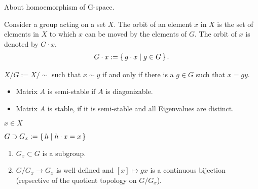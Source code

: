 \begin{rembox}
    \begin{remark}
        About homoemorphism of G-space.
    \end{remark}
\end{rembox}

\begin{defbox}
    \begin{definition}
        Consider a group acting on a set \(X\). The orbit of an element \(x\) in \(X\) is the set of elements in \(X\) to which \(x\) can be moved by the elements of \(G\). The orbit of \(x\) is denoted by \(G \cdot x\).
        \begin{align*}
            G \cdot x := \left\{\, g \cdot x \mid g \in G \,\right\} \text{.}
        \end{align*}
    \end{definition}
\end{defbox}

\begin{defbox}
    \begin{definition}
        \(X / G := X / \sim\) such that \(x \sim y\) if and only if there is a \(g \in G\) such that \(x = gy\).
    \end{definition}
\end{defbox}

\begin{defbox}
    \begin{definition}[Hilbert]
        \begin{itemize}
            \item Matrix \(A\) is semi-stable if \(A\) is diagonizable.
            \item Matrix \(A\) is stable, if it is semi-stable and all Eigenvalues are distinct.
        \end{itemize}
    \end{definition}
\end{defbox}

\begin{defbox}
    \begin{definition}[Stabilisator]
        \(x \in X\)

        \(G \supset G_x := \left\{\, h \mid h \cdot x = x \,\right\}\)
    \end{definition}
\end{defbox}

\begin{thmbox}
    \begin{lemma}
        \begin{enumerate}
            \item \(G_x \subset G\) is a subgroup.
            \item \(G/G_x \longrightarrow G_x\) is well-defined and \([x] \mapsto gx\) is a continuous bijection (repsective of the quotient topology on \(G / G_x\)).
        \end{enumerate}
    \end{lemma}
\end{thmbox}

